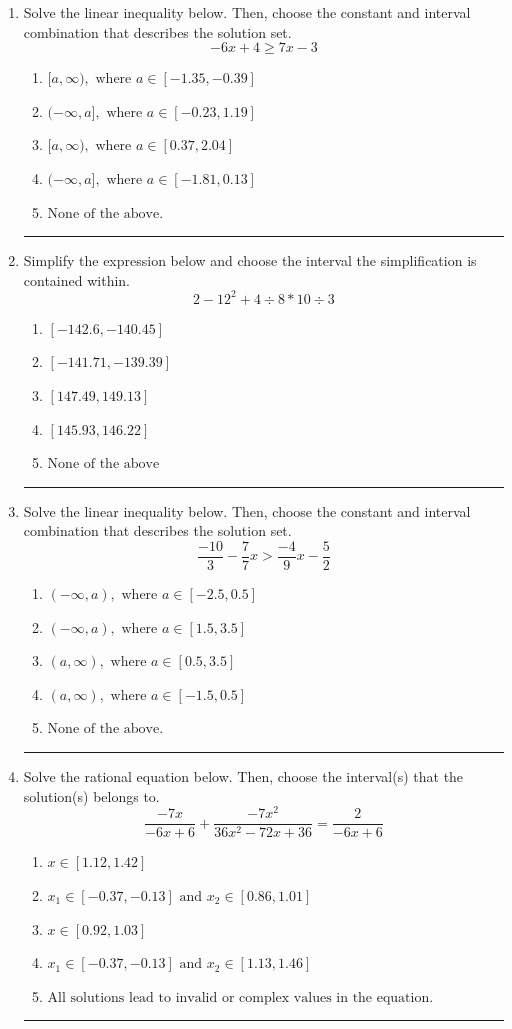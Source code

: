 \documentclass[14pt]{extbook}
\newcommand{\litem}[1]{\item#1\hspace*{-1cm}\rule{\textwidth}{0.4pt}}
\begin{document}
\begin{enumerate}
{\begin{enumerate}[label=\Alph*.]
\end{enumerate} }
\litem{
Solve the linear inequality below. Then, choose the constant and interval combination that describes the solution set.\[ -6x + 4 \geq 7x -3 \]\begin{enumerate}[label=\Alph*.]
\item \( [a, \infty), \text{ where } a \in [-1.35, -0.39] \)
\item \( (-\infty, a], \text{ where } a \in [-0.23, 1.19] \)
\item \( [a, \infty), \text{ where } a \in [0.37, 2.04] \)
\item \( (-\infty, a], \text{ where } a \in [-1.81, 0.13] \)
\item \( \text{None of the above}. \)

\end{enumerate} }
\litem{
Simplify the expression below and choose the interval the simplification is contained within.\[ 2 - 12^2 + 4 \div 8 * 10 \div 3 \]\begin{enumerate}[label=\Alph*.]
\item \( [-142.6, -140.45] \)
\item \( [-141.71, -139.39] \)
\item \( [147.49, 149.13] \)
\item \( [145.93, 146.22] \)
\item \( \text{None of the above} \)

\end{enumerate} }
\litem{
Solve the linear inequality below. Then, choose the constant and interval combination that describes the solution set.\[ \frac{-10}{3} - \frac{7}{7} x > \frac{-4}{9} x - \frac{5}{2} \]\begin{enumerate}[label=\Alph*.]
\item \( (-\infty, a), \text{ where } a \in [-2.5, 0.5] \)
\item \( (-\infty, a), \text{ where } a \in [1.5, 3.5] \)
\item \( (a, \infty), \text{ where } a \in [0.5, 3.5] \)
\item \( (a, \infty), \text{ where } a \in [-1.5, 0.5] \)
\item \( \text{None of the above}. \)

\end{enumerate} }
\litem{
Solve the rational equation below. Then, choose the interval(s) that the solution(s) belongs to.\[ \frac{-7x}{-6x + 6} + \frac{-7x^{2}}{36x^{2} -72 x + 36} = \frac{2}{-6x + 6} \]\begin{enumerate}[label=\Alph*.]
\item \( x \in [1.12,1.42] \)
\item \( x_1 \in [-0.37, -0.13] \text{ and } x_2 \in [0.86,1.01] \)
\item \( x \in [0.92,1.03] \)
\item \( x_1 \in [-0.37, -0.13] \text{ and } x_2 \in [1.13,1.46] \)
\item \( \text{All solutions lead to invalid or complex values in the equation.} \)


\end{enumerate}}
\end{enumerate}
\end{document}

